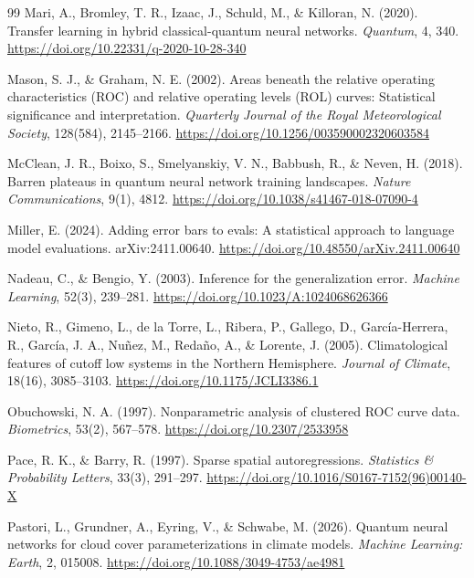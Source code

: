 \documentclass[11pt,a4paper]{article}
\begin{document}
\begin{thebibliography}{99}
Mari, A., Bromley, T. R., Izaac, J., Schuld, M., \& Killoran, N. (2020). Transfer learning in hybrid classical-quantum neural networks. \textit{Quantum}, 4, 340. \url{https://doi.org/10.22331/q-2020-10-28-340}

Mason, S. J., \& Graham, N. E. (2002). Areas beneath the relative operating characteristics (ROC) and relative operating levels (ROL) curves: Statistical significance and interpretation. \textit{Quarterly Journal of the Royal Meteorological Society}, 128(584), 2145--2166. \url{https://doi.org/10.1256/003590002320603584}

McClean, J. R., Boixo, S., Smelyanskiy, V. N., Babbush, R., \& Neven, H. (2018). Barren plateaus in quantum neural network training landscapes. \textit{Nature Communications}, 9(1), 4812. \url{https://doi.org/10.1038/s41467-018-07090-4}

Miller, E. (2024). Adding error bars to evals: A statistical approach to language model evaluations. arXiv:2411.00640. \url{https://doi.org/10.48550/arXiv.2411.00640}

Nadeau, C., \& Bengio, Y. (2003). Inference for the generalization error. \textit{Machine Learning}, 52(3), 239--281. \url{https://doi.org/10.1023/A:1024068626366}

Nieto, R., Gimeno, L., de la Torre, L., Ribera, P., Gallego, D., Garc\'ia-Herrera, R., Garc\'ia, J. A., Nu\~nez, M., Reda\~no, A., \& Lorente, J. (2005). Climatological features of cutoff low systems in the Northern Hemisphere. \textit{Journal of Climate}, 18(16), 3085--3103. \url{https://doi.org/10.1175/JCLI3386.1}

Obuchowski, N. A. (1997). Nonparametric analysis of clustered ROC curve data. \textit{Biometrics}, 53(2), 567--578. \url{https://doi.org/10.2307/2533958}

Pace, R. K., \& Barry, R. (1997). Sparse spatial autoregressions. \textit{Statistics \& Probability Letters}, 33(3), 291--297. \url{https://doi.org/10.1016/S0167-7152(96)00140-X}

Pastori, L., Grundner, A., Eyring, V., \& Schwabe, M. (2026). Quantum neural networks for cloud cover parameterizations in climate models. \textit{Machine Learning: Earth}, 2, 015008. \url{https://doi.org/10.1088/3049-4753/ae4981}


\end{thebibliography}
\end{document}
